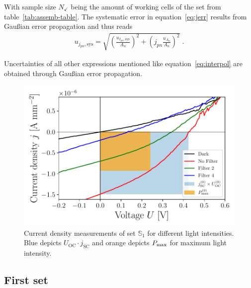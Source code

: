 \documentclass[a4paper,10pt,twocolumn]{article}
\begin{document}
\begin{extract*}
With sample size $N_\checkmark$ being the amount of working cells of the set from table~\ref{tab:assemb-table}. The systematic error in equation~\ref{eq:jerr} results from Gaußian error propagation and thus reads
\begin{align}
	u_{j_{pn},\text{sys}} = \sqrt{ \left( \frac{ u_{I_{pn},\text{sys}}}{A_n}\right)^2+\left(j_{pn}\frac{u_{A_n}}{A_n} \right)^2}\;.
\end{align}

Uncertainties of all other expressions mentioned like equation~\ref{eq:interpol} are obtained through Gaußian error propagation.
\begin{figure}[H]\centering
	\includegraphics[width=\columnwidth]{../../../IV-Curve-Analysis/OSC1Graph.pdf}
	\caption{Current density measurements of set $\mathbb{S}_1$ for different light intensities. Blue depicts $U_{\mathrm{OC}}\!\cdot\!j_{\mathrm{SC}}$ and orange depicts $P_{\text{max}}$ for maximum light intensity.}
	\label{fig:OSC1Graph}
\end{figure}

\subsection{First set}\label{subsec:S1data}


\end{extract*}
\end{document}
